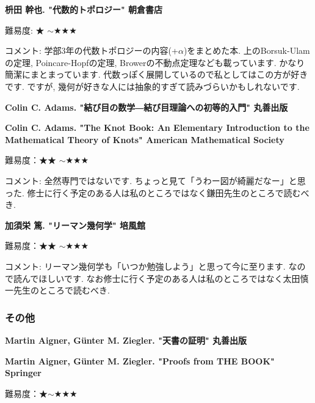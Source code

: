 \textbf{枡田 幹也. "代数的トポロジー" 朝倉書店}  　\vspace{-6pt} 

難易度: ★ $\sim$★★★\vspace{-6pt} 

コメント: 学部3年の代数トポロジーの内容(+$\alpha$)をまとめた本. 上のBorsuk-Ulamの定理, Poincare-Hopfの定理, Browerの不動点定理なども載っています. かなり簡潔にまとまっています. 代数っぽく展開しているので私としてはこの方が好きです.  ですが, 幾何が好きな人には抽象的すぎて読みづらいかもしれないです. 
\vspace{8pt}


\textbf{Colin C. Adams. "結び目の数学―結び目理論への初等的入門" 丸善出版}  　\vspace{-6pt} 

\textbf{Colin C. Adams. "The Knot Book: An Elementary Introduction to the Mathematical Theory of Knots" American Mathematical Society}  　\vspace{-6pt} 

難易度：★★ $\sim$★★★\vspace{-6pt} 

コメント: 全然専門ではないです. ちょっと見て「うわー図が綺麗だなー」と思った. 修士に行く予定のある人は私のところではなく鎌田先生のところで読むべき. 
\vspace{8pt}

\textbf{加須栄 篤. "リーマン幾何学" 培風館}  　\vspace{-6pt} 

難易度：★★ $\sim$★★★\vspace{-6pt} 

コメント: リーマン幾何学も「いつか勉強しよう」と思って今に至ります. なので読んでほしいです. 
なお修士に行く予定のある人は私のところではなく太田慎一先生のところで読むべき.


\subsubsection{その他}

\textbf{Martin Aigner, G\"unter M. Ziegler. "天書の証明" 丸善出版}  　\vspace{-6pt} 

\textbf{Martin Aigner, G\"unter M. Ziegler. "Proofs from THE BOOK" Springer}  　\vspace{-6pt} 

難易度：★$\sim$★★★ 　\vspace{-6pt} 

